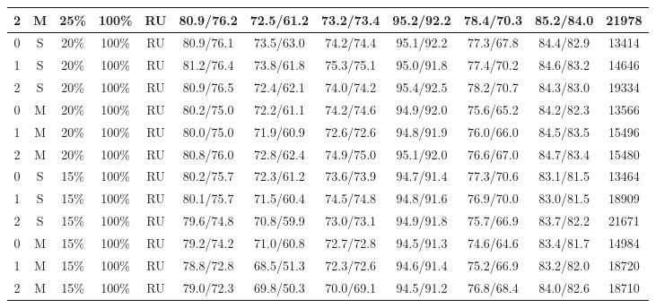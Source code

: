 \begin{table*}
{\begin{tabular}{|c|c|c|c|c||c|c|c|c|c|c||c|}
2 & M & 25\% & 100\% & RU & 80.9/76.2 & 72.5/61.2 & 73.2/73.4 & 95.2/92.2 & 78.4/70.3 & 85.2/84.0 & 21978 \\ \hline
0 & S & 20\% & 100\% & RU & 80.9/76.1 & 73.5/63.0 & 74.2/74.4 & 95.1/92.2 & 77.3/67.8 & 84.4/82.9 & 13414 \\ \hline
1 & S & 20\% & 100\% & RU & 81.2/76.4 & 73.8/61.8 & 75.3/75.1 & 95.0/91.8 & 77.4/70.2 & 84.6/83.2 & 14646 \\ \hline
2 & S & 20\% & 100\% & RU & 80.9/76.5 & 72.4/62.1 & 74.0/74.2 & 95.4/92.5 & 78.2/70.7 & 84.3/83.0 & 19334 \\ \hline
0 & M & 20\% & 100\% & RU & 80.2/75.0 & 72.2/61.1 & 74.2/74.6 & 94.9/92.0 & 75.6/65.2 & 84.2/82.3 & 13566 \\ \hline
1 & M & 20\% & 100\% & RU & 80.0/75.0 & 71.9/60.9 & 72.6/72.6 & 94.8/91.9 & 76.0/66.0 & 84.5/83.5 & 15496 \\ \hline
2 & M & 20\% & 100\% & RU & 80.8/76.0 & 72.8/62.4 & 74.9/75.0 & 95.1/92.0 & 76.6/67.0 & 84.7/83.4 & 15480 \\ \hline
0 & S & 15\% & 100\% & RU & 80.2/75.7 & 72.3/61.2 & 73.6/73.9 & 94.7/91.4 & 77.3/70.6 & 83.1/81.5 & 13464 \\ \hline
1 & S & 15\% & 100\% & RU & 80.1/75.7 & 71.5/60.4 & 74.5/74.8 & 94.8/91.6 & 76.9/70.0 & 83.0/81.5 & 18909 \\ \hline
2 & S & 15\% & 100\% & RU & 79.6/74.8 & 70.8/59.9 & 73.0/73.1 & 94.9/91.8 & 75.7/66.9 & 83.7/82.2 & 21671 \\ \hline
0 & M & 15\% & 100\% & RU & 79.2/74.2 & 71.0/60.8 & 72.7/72.8 & 94.5/91.3 & 74.6/64.6 & 83.4/81.7 & 14984 \\ \hline
1 & M & 15\% & 100\% & RU & 78.8/72.8 & 68.5/51.3 & 72.3/72.6 & 94.6/91.4 & 75.2/66.9 & 83.2/82.0 & 18720 \\ \hline
2 & M & 15\% & 100\% & RU & 79.0/72.3 & 69.8/50.3 & 70.0/69.1 & 94.5/91.2 & 76.8/68.4 & 84.0/82.6 & 18710 \\ \hline
\end{tabular}}
\end{table*}

